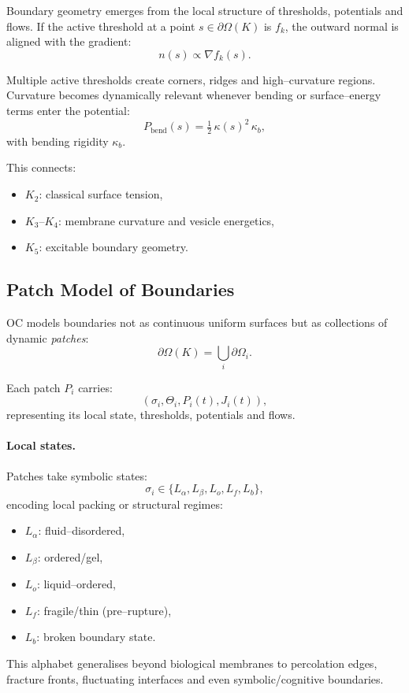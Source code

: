 Boundary geometry emerges from the local structure of thresholds, potentials
and flows.  
If the active threshold at a point \(s \in \partial\Omega(K)\) is \(f_k\), the
outward normal is aligned with the gradient:
\[
  n(s) \propto \nabla f_k(s).
\]

Multiple active thresholds create corners, ridges and high–curvature regions.
Curvature becomes dynamically relevant whenever bending or surface–energy
terms enter the potential:
\[
  P_{\mathrm{bend}}(s) = \tfrac{1}{2}\,\kappa(s)^2\,\kappa_b,
\]
with bending rigidity \(\kappa_b\).

This connects:
\begin{itemize}
    \item \(K_2\): classical surface tension,
    \item \(K_3\)–\(K_4\): membrane curvature and vesicle energetics,
    \item \(K_5\): excitable boundary geometry.
\end{itemize}

\subsection{Patch Model of Boundaries}

OC models boundaries not as continuous uniform surfaces but as collections of
dynamic \emph{patches}:
\[
  \partial\Omega(K) = \bigcup_i \partial\Omega_i.
\]

Each patch \(P_i\) carries:
\[
  (\sigma_i,\Theta_i,P_i(t),J_i(t)),
\]
representing its local state, thresholds, potentials and flows.

\paragraph{Local states.}
Patches take symbolic states:
\[
  \sigma_i \in \{L_\alpha, L_\beta, L_o, L_f, L_b\},
\]
encoding local packing or structural regimes:
\begin{itemize}
    \item \(L_\alpha\): fluid–disordered,
    \item \(L_\beta\): ordered/gel,
    \item \(L_o\): liquid–ordered,
    \item \(L_f\): fragile/thin (pre–rupture),
    \item \(L_b\): broken boundary state.
\end{itemize}

This alphabet generalises beyond biological membranes to percolation edges,
fracture fronts, fluctuating interfaces and even symbolic/cognitive boundaries.

